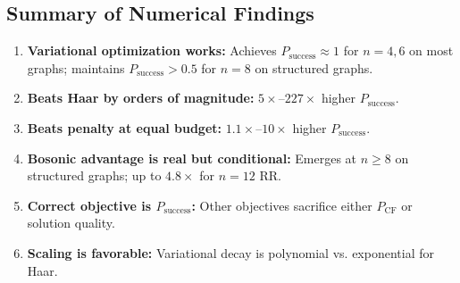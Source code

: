\subsection{Summary of Numerical Findings}

\begin{enumerate}
\item \textbf{Variational optimization works:} Achieves $P_{\mathrm{success}} \approx 1$ for $n=4,6$ on most graphs; maintains $P_{\mathrm{success}} > 0.5$ for $n=8$ on structured graphs.
\item \textbf{Beats Haar by orders of magnitude:} $5\times$--$227\times$ higher $P_{\mathrm{success}}$.
\item \textbf{Beats penalty at equal budget:} $1.1\times$--$10\times$ higher $P_{\mathrm{success}}$.
\item \textbf{Bosonic advantage is real but conditional:} Emerges at $n\ge 8$ on structured graphs; up to $4.8\times$ for $n=12$ RR.
\item \textbf{Correct objective is $P_{\mathrm{success}}$:} Other objectives sacrifice either $P_{\mathrm{CF}}$ or solution quality.
\item \textbf{Scaling is favorable:} Variational decay is polynomial vs. exponential for Haar.
\end{enumerate}
